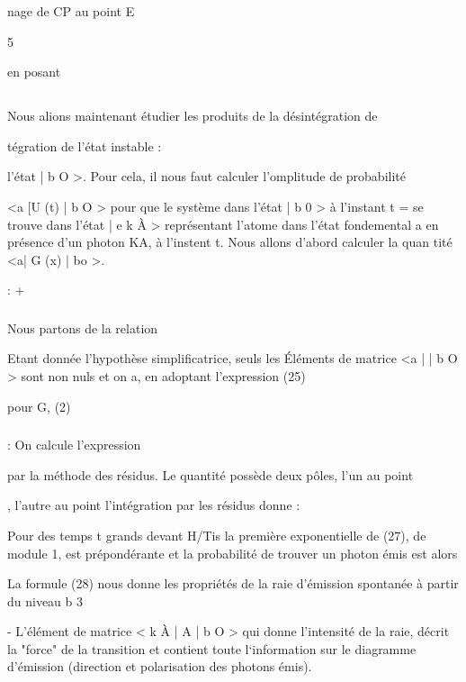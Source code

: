 nage de CP au point E

5

en posant 

\subsection{}%

Nous alions maintenant étudier les produits de la désintégration de

tégration de l'état instable :



l'état | b O >. Pour cela, il nous faut calculer l'omplitude de probabilité

<a  [U (t) | b O > pour que le système dans l'état | b 0 > à l'instant t =
se trouve dans l'état | e k À > représentant l'atome dans l'état fondemental a
en présence d'un photon KA, à l'instent t. Nous allons d'abord calculer la quan
tité <a| G (x) | bo >.


: +
\subsubsection{}%

Nous partons de la relation

Etant donnée l'hypothèse simplificatrice, seuls les Éléments de matrice
<a | | b O > sont non nuls et on a, en adoptant l'expression (25)

pour G, (2)



\subsubsection{}%
: On calcule l'expression

par la méthode des résidus.
Le quantité  possède deux pôles, l'un au point

, l'autre au point  l'intégration par les résidus
donne :

Pour des temps t grands devant H/Tis la première exponentielle
de (27), de module 1, est prépondérante et la probabilité de trouver un photon
 émis est alors


La formule (28) nous donne les propriétés de la raie d'émission spontanée à partir du niveau b 3

- L'élément de matrice <  k À | A | b O > qui donne l'intensité de la raie, décrit la "force" de la transition et contient toute l‘information sur le diagramme d'émission (direction et polarisation des photons
émis).


